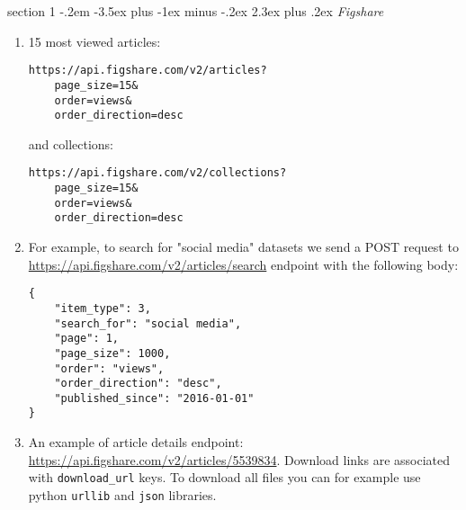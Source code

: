 \documentclass[12pt]{article}
\makeatletter
\newenvironment{problem}{\@startsection
	{section}
	{1}
	{-.2em}
	{-3.5ex plus -1ex minus -.2ex}
	{2.3ex plus .2ex}
	{\pagebreak[3]%
		\large\bf\noindent{Exercise }
	}
}
{\vspace{0.8cm}}
\makeatother
\begin{document}
	
	\begin{problem}{\it Figshare}
		
	\begin{enumerate}[label=\textbf{\alph*)},leftmargin=*]
	\item 15 most viewed articles: 
	\begin{verbatim}
https://api.figshare.com/v2/articles?
	page_size=15&
	order=views&
	order_direction=desc
	\end{verbatim}
	and collections:
	\begin{verbatim}
https://api.figshare.com/v2/collections?
	page_size=15&
	order=views&
	order_direction=desc
\end{verbatim}

	
	\item For example, to search for "social media" datasets we send a POST request to \url{https://api.figshare.com/v2/articles/search} endpoint with the following body:
	\begin{verbatim}
{
	"item_type": 3,
	"search_for": "social media",
	"page": 1,
	"page_size": 1000,
	"order": "views",
	"order_direction": "desc",
	"published_since": "2016-01-01"
}
	\end{verbatim}
	
	\item An example of article details endpoint: \url{https://api.figshare.com/v2/articles/5539834}. Download links are associated with \texttt{download\_url} keys. To download all files you can for example use python \texttt{urllib} and \texttt{json} libraries.
	
	
	
	\end{enumerate}
	
		
	\end{problem}
\end{document}

